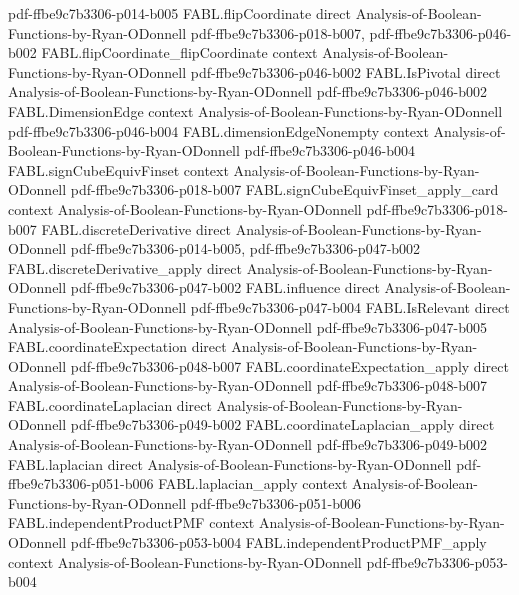 \begin{theorem}
  {pdf-ffbe9c7b3306-p014-b005}
\proofstep
  {FABL.flipCoordinate}
  {direct}
  {Analysis-of-Boolean-Functions-by-Ryan-ODonnell}
  {pdf-ffbe9c7b3306-p018-b007,
    pdf-ffbe9c7b3306-p046-b002}
\proofstep
  {FABL.flipCoordinate_flipCoordinate}
  {context}
  {Analysis-of-Boolean-Functions-by-Ryan-ODonnell}
  {pdf-ffbe9c7b3306-p046-b002}
\proofstep
  {FABL.IsPivotal}
  {direct}
  {Analysis-of-Boolean-Functions-by-Ryan-ODonnell}
  {pdf-ffbe9c7b3306-p046-b002}
\proofstep
  {FABL.DimensionEdge}
  {context}
  {Analysis-of-Boolean-Functions-by-Ryan-ODonnell}
  {pdf-ffbe9c7b3306-p046-b004}
\proofstep
  {FABL.dimensionEdgeNonempty}
  {context}
  {Analysis-of-Boolean-Functions-by-Ryan-ODonnell}
  {pdf-ffbe9c7b3306-p046-b004}
\proofstep
  {FABL.signCubeEquivFinset}
  {context}
  {Analysis-of-Boolean-Functions-by-Ryan-ODonnell}
  {pdf-ffbe9c7b3306-p018-b007}
\proofstep
  {FABL.signCubeEquivFinset_apply_card}
  {context}
  {Analysis-of-Boolean-Functions-by-Ryan-ODonnell}
  {pdf-ffbe9c7b3306-p018-b007}
\proofstep
  {FABL.discreteDerivative}
  {direct}
  {Analysis-of-Boolean-Functions-by-Ryan-ODonnell}
  {pdf-ffbe9c7b3306-p014-b005,
    pdf-ffbe9c7b3306-p047-b002}
\proofstep
  {FABL.discreteDerivative_apply}
  {direct}
  {Analysis-of-Boolean-Functions-by-Ryan-ODonnell}
  {pdf-ffbe9c7b3306-p047-b002}
\proofstep
  {FABL.influence}
  {direct}
  {Analysis-of-Boolean-Functions-by-Ryan-ODonnell}
  {pdf-ffbe9c7b3306-p047-b004}
\proofstep
  {FABL.IsRelevant}
  {direct}
  {Analysis-of-Boolean-Functions-by-Ryan-ODonnell}
  {pdf-ffbe9c7b3306-p047-b005}
\proofstep
  {FABL.coordinateExpectation}
  {direct}
  {Analysis-of-Boolean-Functions-by-Ryan-ODonnell}
  {pdf-ffbe9c7b3306-p048-b007}
\proofstep
  {FABL.coordinateExpectation_apply}
  {direct}
  {Analysis-of-Boolean-Functions-by-Ryan-ODonnell}
  {pdf-ffbe9c7b3306-p048-b007}
\proofstep
  {FABL.coordinateLaplacian}
  {direct}
  {Analysis-of-Boolean-Functions-by-Ryan-ODonnell}
  {pdf-ffbe9c7b3306-p049-b002}
\proofstep
  {FABL.coordinateLaplacian_apply}
  {direct}
  {Analysis-of-Boolean-Functions-by-Ryan-ODonnell}
  {pdf-ffbe9c7b3306-p049-b002}
\proofstep
  {FABL.laplacian}
  {direct}
  {Analysis-of-Boolean-Functions-by-Ryan-ODonnell}
  {pdf-ffbe9c7b3306-p051-b006}
\proofstep
  {FABL.laplacian_apply}
  {context}
  {Analysis-of-Boolean-Functions-by-Ryan-ODonnell}
  {pdf-ffbe9c7b3306-p051-b006}
\proofstep
  {FABL.independentProductPMF}
  {context}
  {Analysis-of-Boolean-Functions-by-Ryan-ODonnell}
  {pdf-ffbe9c7b3306-p053-b004}
\proofstep
  {FABL.independentProductPMF_apply}
  {context}
  {Analysis-of-Boolean-Functions-by-Ryan-ODonnell}
  {pdf-ffbe9c7b3306-p053-b004}

\end{theorem}

